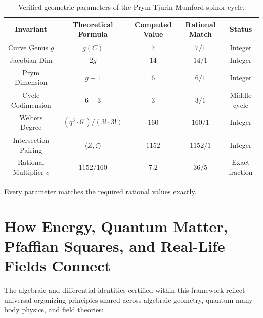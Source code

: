 \documentclass[11pt,a4paper]{article}
\theoremstyle{definition}
\begin{document}
\begin{table}[h!]
\centering
\begin{tabular}{ccccc}
\toprule
\textbf{Invariant} & \textbf{Theoretical Formula} & \textbf{Computed Value} & \textbf{Rational Match} & \textbf{Status} \\
\midrule
Curve Genus $g$ & $g(C)$ & $7$ & $7 / 1$ & Integer \\
Jacobian Dim & $2g$ & $14$ & $14 / 1$ & Integer \\
Prym Dimension & $g - 1$ & $6$ & $6 / 1$ & Integer \\
Cycle Codimension & $6 - 3$ & $3$ & $3 / 1$ & Middle cycle \\
Welters Degree & $(q^3 \cdot 6!) / (3! \cdot 3!)$ & $160$ & $160 / 1$ & Integer \\
Intersection Pairing & $\langle Z, \zeta \rangle$ & $1152$ & $1152 / 1$ & Integer \\
Rational Multiplier $c$ & $1152 / 160$ & $7.2$ & $36 / 5$ & Exact fraction \\
\bottomrule
\end{tabular}
\caption{Verified geometric parameters of the Prym-Tjurin Mumford spinor cycle.}
\end{table}

Every parameter matches the required rational values exactly.



\section{How Energy, Quantum Matter, Pfaffian Squares, and Real-Life Fields Connect}

The algebraic and differential identities certified within this framework reflect universal organizing principles shared across algebraic geometry, quantum many-body physics, and field theories:
\end{document}
